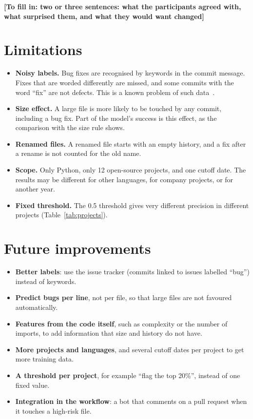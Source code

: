 \documentclass[11pt,a4paper]{article}
\newcommand{\todo}[1]{\textbf{[To fill in: #1]}}
\begin{document}
\todo{two or three sentences: what the participants agreed with, what
surprised them, and what they would want changed}

\section{Limitations}

\begin{itemize}
\item \textbf{Noisy labels.} Bug fixes are recognised by keywords in the commit
      message. Fixes that are worded differently are missed, and some commits
      with the word ``fix'' are not defects. This is a known problem of such
      data~\cite{herzig}.
\item \textbf{Size effect.} A large file is more likely to be touched by any
      commit, including a bug fix. Part of the model's success is this effect,
      as the comparison with the size rule shows.
\item \textbf{Renamed files.} A renamed file starts with an empty history, and
      a fix after a rename is not counted for the old name.
\item \textbf{Scope.} Only Python, only 12 open-source projects, and one
      cutoff date. The results may be different for other languages, for
      company projects, or for another year.
\item \textbf{Fixed threshold.} The 0.5 threshold gives very different
      precision in different projects (Table~\ref{tab:projects}).
\end{itemize}

\section{Future improvements}

\begin{itemize}
\item \textbf{Better labels}: use the issue tracker (commits linked to issues
      labelled ``bug'') instead of keywords.
\item \textbf{Predict bugs per line}, not per file, so that large files are
      not favoured automatically.
\item \textbf{Features from the code itself}, such as complexity or the number
      of imports, to add information that size and history do not have.
\item \textbf{More projects and languages}, and several cutoff dates per
      project to get more training data.
\item \textbf{A threshold per project}, for example ``flag the top 20\%'',
      instead of one fixed value.
\item \textbf{Integration in the workflow}: a bot that comments on a pull
      request when it touches a high-risk file.
\end{itemize}
\end{document}
